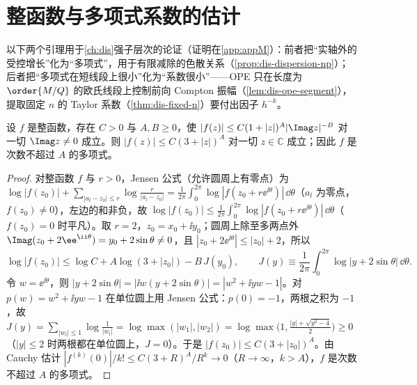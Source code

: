\section{整函数与多项式系数的估计}\label{sec:appK-entire}

以下两个引理用于\cref{ch:dis}强子层次的论证（证明在\cref{app:appM}）：前者把“实轴外的受控增长”化为“多项式”，用于有限减除的色散关系（\cref{prop:dis-dispersion-np}）；后者把“多项式在短线段上很小”化为“系数很小”——OPE 只在长度为 $\order{M/Q}$ 的欧氏线段上控制前向 Compton 振幅（\cref{lem:dis-ope-segment}），提取固定 $n$ 的 Taylor 系数（\cref{thm:dis-fixed-n}）要付出因子 $h^{-k}$。

\begin{lemma}[受控增长的整函数]\label{lem:appK-entire}
设 $f$ 是整函数，存在 $C>0$ 与 $A,B\ge0$，使 $|f(z)|\le C(1+|z|)^A|\Imag z|^{-B}$ 对一切 $\Imag z\ne0$ 成立。则 $|f(z)|\le C(3+|z|)^A$ 对一切 $z\in\mathbb C$ 成立；因此 $f$ 是次数不超过 $A$ 的多项式。
\end{lemma}

\begin{proof}
对整函数 $f$ 与 $r>0$，Jensen 公式（允许圆周上有零点）\cite[第~15.16--15.20~节]{Rudin1987}为 $\log|f(z_0)|+\sum_{|a_l-z_0|\le r}\log\frac{r}{|a_l-z_0|}=\frac1{2\pi}\int_0^{2\pi}\log|f(z_0+r\ee^{\ii\theta})|\,\dd\theta$（$a_l$ 为零点，$f(z_0)\ne0$），左边的和非负，故 $\log|f(z_0)|\le\frac1{2\pi}\int_0^{2\pi}\log|f(z_0+r\ee^{\ii\theta})|\,\dd\theta$（$f(z_0)=0$ 时平凡）。取 $r=2$，$z_0=x_0+\ii y_0$；圆周上除至多两点外 $\Imag(z_0+2\ee^{\ii\theta})=y_0+2\sin\theta\ne0$，且 $|z_0+2\ee^{\ii\theta}|\le|z_0|+2$，所以
\[
\log|f(z_0)|\le\log C+A\log(3+|z_0|)-B\,J(y_0),\qquad J(y)\equiv\frac1{2\pi}\int_0^{2\pi}\log|y+2\sin\theta|\,\dd\theta .
\]
令 $w=\ee^{\ii\theta}$，则 $|y+2\sin\theta|=|\ii w(y+2\sin\theta)|=|w^2+\ii yw-1|$。对 $p(w)=w^2+\ii yw-1$ 在单位圆上用 Jensen 公式：$p(0)=-1$，两根之积为 $-1$，故 $J(y)=\sum_{|w_l|\le1}\log\frac1{|w_l|}=\log\max(|w_1|,|w_2|)=\log\max\big(1,\frac{|y|+\sqrt{y^2-4}}2\big)\ge0$（$|y|\le2$ 时两根都在单位圆上，$J=0$）。于是 $|f(z_0)|\le C(3+|z_0|)^A$。由 Cauchy 估计 $|f^{(k)}(0)|/k!\le C(3+R)^A/R^k\to0$（$R\to\infty$，$k>A$），$f$ 是次数不超过 $A$ 的多项式。
\end{proof}

